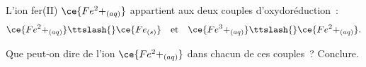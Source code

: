 L'ion fer(II) $\ce{Fe^2+_{(aq)}}$ appartient aux deux couples d'oxydoréduction~:
\[
    \ce{Fe^2+_{(aq)}}\ttslash{}\ce{Fe_{(s)}} \quad\text{et}\quad
    \ce{Fe^3+_{(aq)}}\ttslash{}\ce{Fe^2+_{(aq)}}.
\]

Que peut-on dire de l'ion $\ce{Fe^2+_{(aq)}}$ dans chacun de ces couples~?
Conclure.

